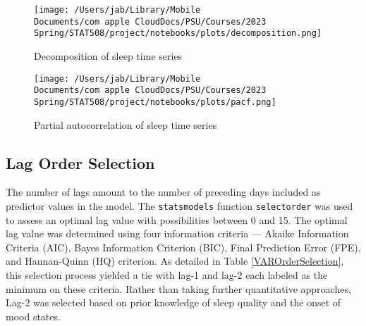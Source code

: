 \documentclass{article}
\begin{document}
\begin{figure}[hb]
\centering
  \texttt{[image: /Users/jab/Library/Mobile Documents/com~apple~CloudDocs/PSU/Courses/2023 Spring/STAT508/project/notebooks/plots/decomposition.png]}
\caption{Decomposition of sleep time series}
\label{Decomposition}
\end{figure}

\begin{figure}[hb]
\centering
  \texttt{[image: /Users/jab/Library/Mobile Documents/com~apple~CloudDocs/PSU/Courses/2023 Spring/STAT508/project/notebooks/plots/pacf.png]}
\caption{Partial autocorrelation of sleep time series}
\label{PACF}
\end{figure}

\hypertarget{lag-order-selection}{%
\subsection{Lag Order Selection}\label{lag-order-selection}}

The number of lags amount to the number of preceding days included as predictor
values in the model. The \texttt{statsmodels} function \texttt{selectorder} was
used to assess an optimal lag value with possibilities between 0 and 15. The
optimal lag value was determined using four information criteria --- Akaike
Information Criteria (AIC), Bayes Information Criterion (BIC), Final Prediction
Error (FPE), and Hannan-Quinn (HQ) criterion. As detailed in Table
\ref{VAROrderSelection}, this selection process yielded a tie with lag-1 and
lag-2 each labeled as the minimum on these criteria. Rather than taking further
quantitative approaches, Lag-2 was selected based on prior knowledge of sleep
quality and the onset of mood states.
\end{document}
